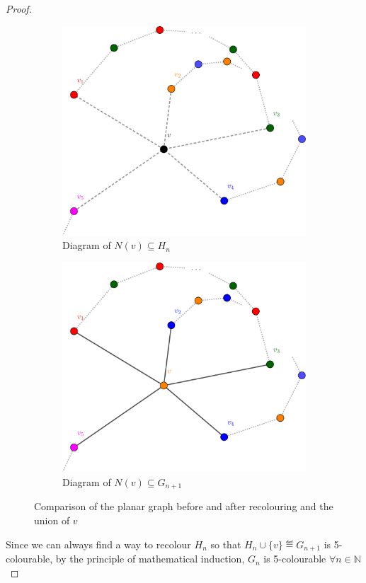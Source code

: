 \begin{proof}
\begin{figure}[H]
\centering
\begin{subfigure}[H]{0.49\textwidth}
\includegraphics[width=\textwidth]{img/case2b_first.pdf}
\caption{Diagram of $N(v) \subseteq H_{n}$}
\label{fig:case2a_first}
\end{subfigure}
\begin{subfigure}[H]{0.49\textwidth}
\includegraphics[width=\textwidth]{img/case2b_second.pdf}
\caption{Diagram of $N(v) \subseteq G_{n + 1}$}
\label{fig:case2a_second}
\end{subfigure}
\caption{Comparison of the planar graph before and after recolouring and the union of $v$}
\end{figure}

Since we can always find a way to recolour $H_{n}$ so that $H_{n} \cup \{v\} \eqdef G_{n + 1}$ is 5-colourable, by the principle of mathematical induction, $G_{n}$ is 5-colourable $\forall n \in \mathbb{N}$
\end{proof}